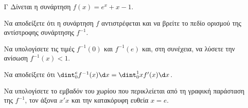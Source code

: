 \begin{thema}{Γ}
Δίνεται η συνάρτηση $f(x) = e^x + x - 1$.
\begin{erwthma}
  \item Να αποδείξετε ότι η συνάρτηση $f$ αντιστρέφεται και να βρείτε το πεδίο ορισμού της αντίστροφης συνάρτησης $f^{-1}$.
  \item Να υπολογίσετε τις τιμές $f^{-1}(0)$ και $f^{-1}(e)$ και, στη συνέχεια, να λύσετε την ανίσωση $f^{-1}(x) < 1$.
  \item Να αποδείξετε ότι $\dint_0^e f^{-1}(x) \d x = \dint_0^1 x f'(x) \d x$.
  \item Να υπολογίσετε το εμβαδόν του χωρίου που περικλείεται από τη γραφική παράσταση της $f^{-1}$, τον άξονα $x'x$ και την κατακόρυφη ευθεία $x = e$.
\end{erwthma}
\end{thema}
